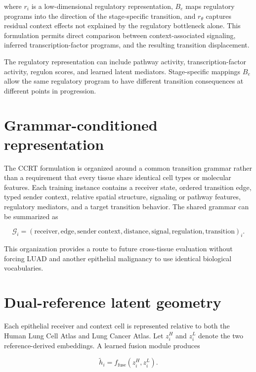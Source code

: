 where $r_i$ is a low-dimensional regulatory representation, $B_e$ maps regulatory programs into the direction of the stage-specific transition, and $r_{\theta}$ captures residual context effects not explained by the regulatory bottleneck alone. This formulation permits direct comparison between context-associated signaling, inferred transcription-factor programs, and the resulting transition displacement.

The regulatory representation can include pathway activity, transcription-factor activity, regulon scores, and learned latent mediators. Stage-specific mappings $B_e$ allow the same regulatory program to have different transition consequences at different points in progression.

\section{Grammar-conditioned representation}

The CCRT formulation is organized around a common transition grammar rather than a requirement that every tissue share identical cell types or molecular features. Each training instance contains a receiver state, ordered transition edge, typed sender context, relative spatial structure, signaling or pathway features, regulatory mediators, and a target transition behavior. The shared grammar can be summarized as

\begin{equation}
\mathcal{G}_i
=
\left(
\mathrm{receiver},
\mathrm{edge},
\mathrm{sender\ context},
\mathrm{distance},
\mathrm{signal},
\mathrm{regulation},
\mathrm{transition}
\right)_i.
\end{equation}

This organization provides a route to future cross-tissue evaluation without forcing LUAD and another epithelial malignancy to use identical biological vocabularies.

\section{Dual-reference latent geometry}

Each epithelial receiver and context cell is represented relative to both the Human Lung Cell Atlas and Lung Cancer Atlas. Let $z_i^{H}$ and $z_i^{L}$ denote the two reference-derived embeddings. A learned fusion module produces

\begin{equation}
\tilde{h}_i
=
f_{\mathrm{fuse}}\left(z_i^{H},z_i^{L}\right).
\end{equation}


